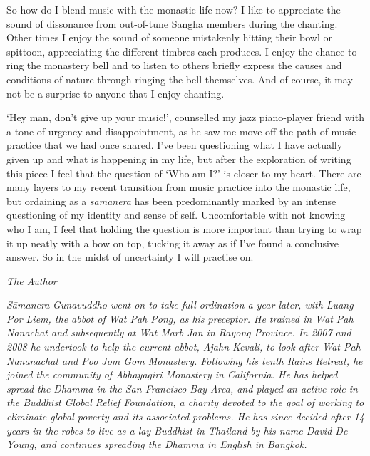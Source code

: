 So how do I blend music with the monastic life now? I like to appreciate
the sound of dissonance from out-of-tune Sangha members during the
chanting. Other times I enjoy the sound of someone mistakenly hitting
their bowl or spittoon, appreciating the different timbres each
produces. I enjoy the chance to ring the monastery bell and to listen to
others briefly express the causes and conditions of nature through
ringing the bell themselves. And of course, it may not be a surprise to
anyone that I enjoy chanting.

`Hey man, don't give up your music!', counselled my jazz piano-player
friend with a tone of urgency and disappointment, as he saw me move off
the path of music practice that we had once shared. I've been
questioning what I have actually given up and what is happening in my
life, but after the exploration of writing this piece I feel that the
question of `Who am I?' is closer to my heart. There are many layers to
my recent transition from music practice into the monastic life, but
ordaining as a \emph{sāmanera} has been predominantly marked by an
intense questioning of my identity and sense of self. Uncomfortable with
not knowing who I am, I feel that holding the question is more important
than trying to wrap it up neatly with a bow on top, tucking it away as
if I've found a conclusive answer. So in the midst of uncertainty I will
practise on.

\emph{ The Author}

\emph{Sāmanera} \emph{Gunavuddho went on to take full ordination a year
later, with Luang Por Liem, the abbot of Wat Pah Pong, as his preceptor.
He trained in Wat Pah Nanachat and subsequently at Wat Marb Jan in
Rayong Province. In 2007 and 2008 he undertook to help the current
abbot, Ajahn Kevali, to look after Wat Pah Nananachat and Poo Jom Gom
Monastery. Following his tenth Rains Retreat, he joined the community of
Abhayagiri Monastery in California. He has helped spread the Dhamma in
the San Francisco Bay Area, and played an active role in the Buddhist
Global Relief Foundation, a charity devoted to the goal of working to
eliminate global poverty and its associated problems. He has since
decided after 14 years in the robes to live as a lay Buddhist in
Thailand by his name David De Young, and continues spreading the Dhamma
in English in Bangkok.}

